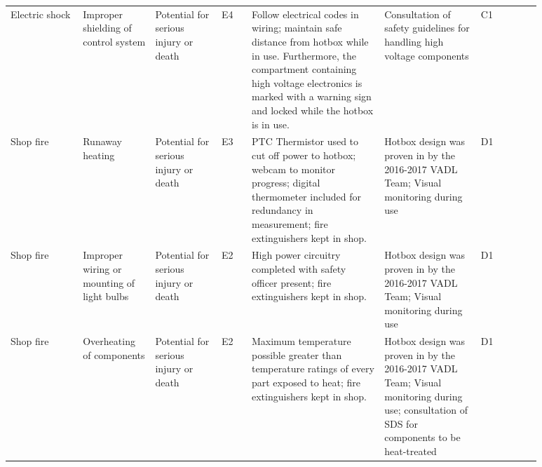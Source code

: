 \begin{footnotesize}
\begin{longtable}{|L{0.12\linewidth}|L{0.12\linewidth}|L{0.11\linewidth}|C{0.05\linewidth} |L{0.22\linewidth}|L{0.16\linewidth}|C{0.10\linewidth}|}
			\pagebreak
			  \\
			\hline
			Electric shock & Improper shielding of control system & Potential for serious injury or death &  E4 & {Follow electrical codes in wiring; maintain safe distance from hotbox while in use. Furthermore, the compartment containing high voltage electronics is marked with a warning sign and locked while the hotbox is in use.} & Consultation of safety guidelines for handling high voltage components &  C1 \\
			\hline
			Shop fire & Runaway heating & Potential for serious injury or death &  E3 & PTC Thermistor used to cut off power to hotbox; webcam to monitor progress; digital thermometer included for redundancy in measurement; fire extinguishers kept in shop. & Hotbox design was proven in by the 2016-2017 VADL Team; Visual monitoring during use
			&  D1 \\
			\hline
			Shop fire & Improper wiring or mounting of light bulbs & Potential for serious injury or death &  E2 & High power circuitry completed with safety officer present; fire extinguishers kept in shop. & Hotbox design was proven in by the 2016-2017 VADL Team; Visual monitoring during use
			&  D1 \\
			\hline
			Shop fire & Overheating of components & Potential for serious injury or death &  E2 & Maximum temperature possible greater than temperature ratings of every part exposed to heat; fire extinguishers kept in shop. & Hotbox design was proven in by the 2016-2017 VADL Team; Visual monitoring during use; consultation of SDS for components to be heat-treated &  D1 \\
			\hline
			
		\end{longtable}
	\end{footnotesize}

